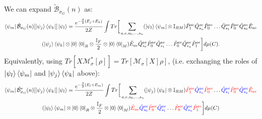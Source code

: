\documentclass[aps,floatfix,10pt,amssymb,amsfont,amsmath,superscriptaddress,float,nofootinbib,longbibliography,nobalancelastpage,twocolumn]{revtex4-2}
\begin{document}
We can expand $\tilde{\mathcal{B}}_{\sigma_G}(n)$ as:
\begin{multline}
    \bra{\psi_m}\tilde{\mathcal{B}}_{\sigma_G}(n)[\ket{\psi_j}\bra{\psi_k}]\ket{\psi_l} = \frac{e^{-\frac{\beta}{2}(E_j+E_k)}}{2Z}\int Tr\bigg[ \sum_{a,e,s_0,\ldots,s_n}(\ket{\psi_l}\bra{\psi_m}\otimes \mathbb{I}_{RM})\tilde P^{ae}_1\tilde Q^{ae}_{s_n}\tilde P^{ae}_0\ldots\tilde Q^{ae}_{s_1}\tilde P^{ae}_0\tilde Q^{ae}_{s_0}\tilde E_{ae} \\(\ket{\psi_j}\bra{\psi_k}\otimes \ket{0}\bra{0}_R\otimes \frac{\mathbb{I}_F}{2}\otimes \ket{0}\bra{0}_M)  \tilde E_{ae}\tilde Q^{ae}_{s_0}\tilde P^{ae}_0\tilde Q^{ae}_{s_1}\ldots\tilde P^{ae}_0\tilde Q^{ae}_{s_n}\tilde P^{ae}_1\bigg]d\mu(C).
\end{multline}
Equivalently, using $Tr[X\mathcal{M}^*_{\sigma}[\rho]] = Tr[\mathcal{M}_{\sigma}[X]\rho]$, (i.e. exchanging the roles of $\ket{\psi_l}\bra{\psi_m}$ and $\ket{\psi_j}\bra{\psi_k}$ above):
\begin{multline}
       \bra{\psi_m}\tilde{\mathcal{B}}^*_{\sigma_G}(n)[\ket{\psi_j}\bra{\psi_k}]\ket{\psi_l} = \frac{e^{-\frac{\beta}{2}(E_l+E_m)}}{2Z}\int Tr\bigg[ \sum_{a,e,s_0,\ldots,s_n}(\ket{\psi_j}\bra{\psi_k}\otimes \mathbb{I}_{RM})\textcolor{red}{\tilde P^{ae}_1}\textcolor{blue}{\tilde Q^{ae}_{s_n}}\textcolor{red}{\tilde P^{ae}_0}\ldots\textcolor{blue}{\tilde Q^{ae}_{s_1}}\textcolor{red}{\tilde P^{ae}_0}\textcolor{blue}{\tilde Q^{ae}_{s_0}}\textcolor{red}{\tilde E_{ae}} \\(\ket{\psi_l}\bra{\psi_m}\otimes \ket{0}\bra{0}_R\otimes \frac{\mathbb{I}_F}{2}\otimes \ket{0}\bra{0}_M)  \textcolor{red}{\tilde E_{ae}}\textcolor{blue}{\tilde Q^{ae}_{s_0}}\textcolor{red}{\tilde P^{ae}_0}\textcolor{blue}{\tilde Q^{ae}_{s_1}}\ldots\textcolor{red}{\tilde P^{ae}_0}\textcolor{blue}{\tilde Q^{ae}_{s_n}}\textcolor{red}{\tilde P^{ae}_1}\bigg]d\mu(C)
    \label{eq:Bstarexpanded}
\end{multline}
\end{document}
